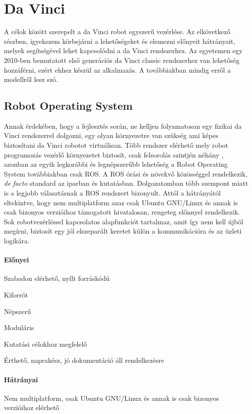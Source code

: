 \documentclass[12pt,a4paper,oneside]{report} %
\begin{document}
\section{Da Vinci}
A célok között szerepelt a da Vinci robot egyszerű vezérlése. 
Az elkövetkező részben, igyekszem körbejárni a lehetőségeket és elemezni előnyeit hátrányait, melyek segítségével lehet kapcsolódni a da Vinci rendszerhez. Az egyetemen egy 2010-ben bemutatott első generációs da Vinci classic rendszerhez van lehetőség hozzáférni, ezért ehhez készül az alkalmazás. A továbbiakban mindig erről a modellről lesz szó.
\subsection{Robot Operating System}
Annak érdekében, hogy a fejlesztés során, ne kelljen folyamatosan egy fizikai da Vinci rendszerrel dolgozni, egy olyan környezetre van szükség ami képes biztosítani da Vinci robotot virtuálisan. Több rendszer elérhető mely robot programozás vezérlő környezetet biztosít, csak felsorolás szintjén néhány \cite{BibEntry2020May, montemerlo2003perspectives}, azonban az egyik legkorábbi és legnépszerűbb lehetőség a Robot Operating System \cite{quigley2009ros} továbbiakban csak ROS. A ROS órási és növekvő közösséggel rendelkezik, \textit{de facto} standard az iparban és kutatásban. Dolgozatomban több szempont miatt is a legjobb választásnak a ROS rendszert bizonyult. Attól a hátrányától eltekintve, hogy nem multiplatform azaz csak Ubuntu GNU/Linux és annak is csak bizonyos verzióihoz támogatott hivatalosan, rengeteg előnnyel rendelkezik. Sok robotvezérléssel kapcsolatos alapfunkciót tartalmaz, amit így nem kell újból megírni, biztosít egy jól elszeparált keretet külön a kommunikációra és az üzleti logikára.
\paragraph{Előnyei} 
\begin{compactitem}
	\item Szabadon elérhető, nyílt forráskódú
	\item Kiforrót
	\item Népszerű
	\item Moduláris
	\item Kutatási célokhoz megfelelő
	\item Érthető, naprakész, jó dokumentáció áll rendelkezésre
\end{compactitem}
\paragraph{Hátrányai} 
\begin{compactitem}
	\item Nem multiplatform, csak Ubuntu GNU/Linux és annak is csak bizonyos verzióihoz elérhető
\end{compactitem}
\end{document}
